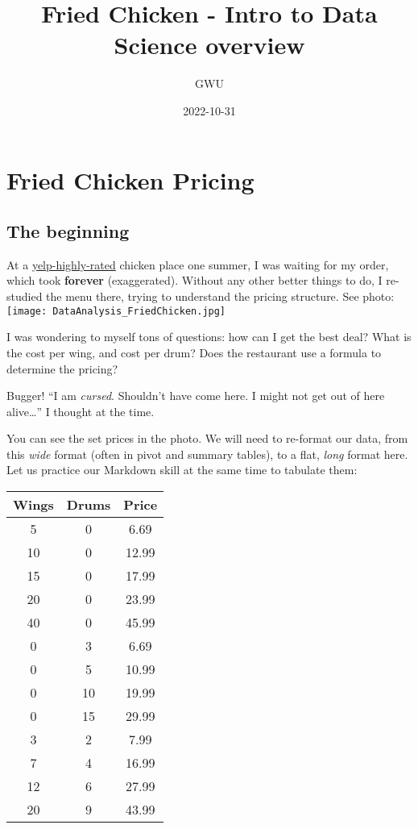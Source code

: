 \documentclass[
]{article}
\title{Fried Chicken - Intro to Data Science overview}
\author{GWU}
\date{2022-10-31}
\begin{document}
\maketitle

\hypertarget{fried-chicken-pricing}{%
\section{Fried Chicken Pricing}\label{fried-chicken-pricing}}

\hypertarget{the-beginning}{%
\subsection{The beginning}\label{the-beginning}}

At a \href{https://www.yelp.com}{yelp-highly-rated} chicken place one
summer, I was waiting for my order, which took \textbf{forever}
(exaggerated). Without any other better things to do, I re-studied the
menu there, trying to understand the pricing structure. See photo:\\
\texttt{[image: DataAnalysis\_FriedChicken.jpg]}

I was wondering to myself tons of questions: how can I get the best
deal? What is the cost per wing, and cost per drum? Does the restaurant
use a formula to determine the pricing?

Bugger! ``I am \emph{cursed}. Shouldn't have come here. I might not get
out of here alive\ldots{}'' I thought at the time.

You can see the set prices in the photo. We will need to re-format our
data, from this \emph{wide} format (often in pivot and summary tables),
to a flat, \emph{long} format here. Let us practice our Markdown skill
at the same time to tabulate them:

\begin{longtable}[]{@{}ccc@{}}
\toprule()
Wings & Drums & Price \\
\midrule()
\endhead
5 & 0 & 6.69 \\
10 & 0 & 12.99 \\
15 & 0 & 17.99 \\
20 & 0 & 23.99 \\
40 & 0 & 45.99 \\
0 & 3 & 6.69 \\
0 & 5 & 10.99 \\
0 & 10 & 19.99 \\
0 & 15 & 29.99 \\
3 & 2 & 7.99 \\
7 & 4 & 16.99 \\
12 & 6 & 27.99 \\
20 & 9 & 43.99 \\
\bottomrule()
\end{longtable}
\end{document}
